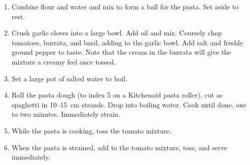 
\begin{ingredients}
\end{ingredients}


\begin{recipe}
  \begin{enumerate}

  \item Combine flour and water and mix to form a ball for the pasta.  Set aside to rest.

  \item Crush garlic cloves into a large bowl.  Add oil and mix.
    Coursely chop tomatoes, burrata, and basil, adding to the garlic
    bowl.  Add salt and freshly ground pepper to taste.  Note that the
    cream in the burrata will give the mixture a creamy feel once tossed.

  \item Set a large pot of salted water to boil.

  \item Roll the pasta dough (to index 5 on a Kitchenaid pasta
    roller), cut as spaghetti in 10--15~cm strands.  Drop into boiling
    water.  Cook until done, one to two minutes.  Immediately strain.

  \item While the pasta is cooking, toss the tomato mixture.

  \item When the pasta is strained, add to the tomato mixture, toss,
    and serve immediately.

  \end{enumerate}
\end{recipe}
